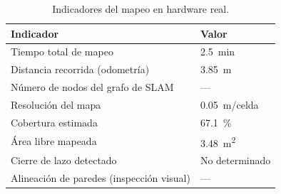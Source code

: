 \begin{table}[H]
\centering
\caption{Indicadores del mapeo en hardware real.}
\label{tab:slam_real_indicadores}
\begin{tabular}{ll}
\hline
\textbf{Indicador} & \textbf{Valor} \\
\hline
Tiempo total de mapeo                  & 2.5~min \\
Distancia recorrida (odometría)        & 3.85~m \\
Número de nodos del grafo de SLAM      & --- \\
Resolución del mapa                    & 0.05~m/celda \\
Cobertura estimada                     & 67.1~\% \\
Área libre mapeada                     & 3.48~m\textsuperscript{2} \\
Cierre de lazo detectado               & No determinado \\
Alineaci\'on de paredes (inspecci\'on visual) & --- \\
\hline
\end{tabular}
\end{table}